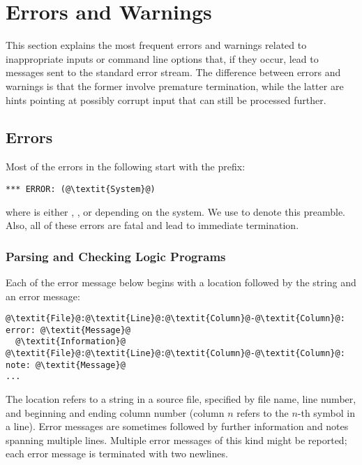 \section{Errors and Warnings}\label{sec:errorwarn}

This section explains the most frequent errors and warnings 
related to inappropriate inputs or command line options that,
if they occur,
lead to messages sent to the standard error stream.
The difference between errors and warnings is that the former involve premature termination,
while the latter are hints pointing at possibly corrupt input that can still be processed further.

\subsection{Errors}\label{sec:error}

Most of the errors in the following start with the prefix:
\begin{lstlisting}[numbers=none,escapechar=@]
*** ERROR: (@\textit{System}@)
\end{lstlisting}
where  is either , , or  depending on the system.
We use  to denote this preamble.
Also, all of these errors are fatal and lead to immediate termination.

\subsubsection{Parsing and Checking Logic Programs}\label{subsec:error:parselp}

Each of the error message below begins with a location followed by the string  and an error message:
\begin{lstlisting}[numbers=none,escapechar=@]
@\textit{File}@:@\textit{Line}@:@\textit{Column}@-@\textit{Column}@: error: @\textit{Message}@
  @\textit{Information}@
@\textit{File}@:@\textit{Line}@:@\textit{Column}@-@\textit{Column}@: note: @\textit{Message}@
...

\end{lstlisting}
The location refers to a string in a source file, specified by file name, line number, and beginning and ending column number
(column $n$ refers to the $n$-th symbol in a line).
Error messages are sometimes followed by further information and notes spanning multiple lines.
Multiple error messages of this kind might be reported; 
each error message is terminated with two newlines.

